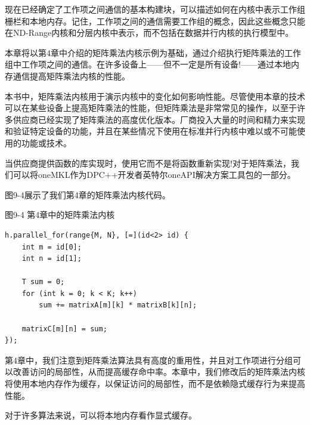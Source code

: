 现在已经确定了工作项之间通信的基本构建块，可以描述如何在内核中表示工作组栅栏和本地内存。记住，工作项之间的通信需要工作组的概念，因此这些概念只能在ND-Range内核和分层内核中表示，而不包括在数据并行内核的执行模型中。\par

本章将以第4章中介绍的矩阵乘法内核示例为基础，通过介绍执行矩阵乘法的工作组中工作项之间的通信。在许多设备上——但不一定是所有设备!——通过本地内存通信提高矩阵乘法内核的性能。\par

\begin{tcolorbox}[colback=blue!5!white,colframe=blue!75!black, title=关于矩阵乘法的注意事项]
本书中，矩阵乘法内核用于演示内核中的变化如何影响性能。尽管使用本章的技术可以在某些设备上提高矩阵乘法的性能，但矩阵乘法是非常常见的操作，以至于许多供应商已经实现了矩阵乘法的高度优化版本。厂商投入大量的时间和精力来实现和验证特定设备的功能，并且在某些情况下使用在标准并行内核中难以或不可能使用的功能或技术。
\end{tcolorbox}

\begin{tcolorbox}[colback=blue!5!white,colframe=blue!75!black, title=使用供应商提供的库!]
当供应商提供函数的库实现时，使用它而不是将函数重新实现!对于矩阵乘法，我们可以将oneMKL作为DPC++开发者英特尔oneAPI解决方案工具包的一部分。
\end{tcolorbox}

图9-4展示了我们第4章的矩阵乘法内核代码。\par

\hspace*{\fill} \par %
图9-4 第4章中的矩阵乘法内核
\begin{lstlisting}[caption={}]
h.parallel_for(range{M, N}, [=](id<2> id) {
	int m = id[0];
	int n = id[1];
	
	T sum = 0;
	for (int k = 0; k < K; k++)
		sum += matrixA[m][k] * matrixB[k][n];
		
	matrixC[m][n] = sum;
});
\end{lstlisting}

第4章中，我们注意到矩阵乘法算法具有高度的重用性，并且对工作项进行分组可以改善访问的局部性，从而提高缓存命中率。本章中，我们修改后的矩阵乘法内核将使用本地内存作为缓存，以保证访问的局部性，而不是依赖隐式缓存行为来提高性能。\par

\begin{tcolorbox}[colback=red!5!white,colframe=red!75!black]
对于许多算法来说，可以将本地内存看作显式缓存。
\end{tcolorbox}

